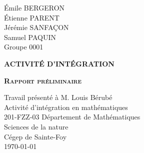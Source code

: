 \begin{titlepage}
    \noindent
    Émile BERGERON\\
    Étienne PARENT\\
    Jérémie SANFAÇON\\
    Samuel PAQUIN\\
    \noindent
    Groupe 0001


    \indent
	\centering
	\vspace{2cm}

	{\scshape\textbf{ACTIVITÉ D'INTÉGRATION}}\\
	{\scshape\textbf{Rapport préliminaire}\par}
	\vspace{2cm}
	{Travail présenté à M.  Louis Bérubé}\\
	\vspace{2cm}
	{Activité d'intégration en mathématiques}\\
    {201-FZZ-03}
	\vfill
	{Département de Mathématiques}\\
	{Sciences de la nature}\\
	{Cégep de Sainte-Foy}\\
	{\large \today}
\end{titlepage}
